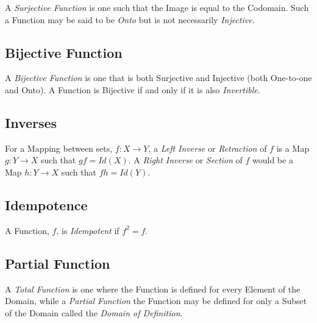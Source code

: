 A \emph{Surjective Function} is one such that the Image is equal to
the Codomain. Such a Function may be said to be \emph{Onto} but is not
necessarily \emph{Injective}.



\subsection{Bijective Function}\label{sec:bijective_function}

A \emph{Bijective Function} is one that is both Surjective and
Injective (both One-to-one and Onto). A Function is Bijective if and
only if it is also \emph{Invertible}.



\subsection{Inverses}\label{sec:inverse_functions}

For a Mapping between sets, $f: X \rightarrow Y$, a \emph{Left
  Inverse} or \emph{Retraction} of $f$ is a Map $g: Y \rightarrow X$
such that $gf = Id(X)$. A \emph{Right Inverse} or \emph{Section} of
$f$ would be a Map $h: Y \rightarrow X$ such that $fh = Id(Y)$.



\subsection{Idempotence}\label{sec:idempotence}

A Function, $f$, is \emph{Idempotent} if $f^2 = f$.



\subsection{Partial Function}\label{sec:partial_function}

A \emph{Total Function} is one where the Function is defined for every
Element of the Domain, while a \emph{Partial Function} the Function
may be defined for only a Subset of the Domain called the \emph{Domain
  of Definition}.



